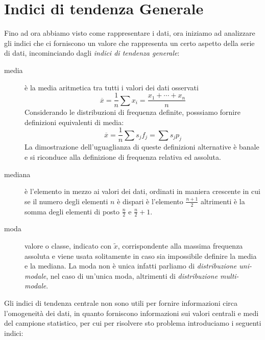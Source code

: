 \documentclass[a4paper,12pt, oneside]{book}
\begin{document}
\section{Indici di tendenza Generale}
Fino ad ora abbiamo visto come rappresentare i dati, ora iniziamo ad analizzare gli indici
che ci forniscono un valore che rappresenta un certo aspetto della serie di dati, 
incominciando dagli \emph{indici di tendenza generale}:
\begin{description}
    \item [media] è la media aritmetica tra tutti i valori dei dati osservati 
            \[ \overline{x} = \frac{1}{n} \sum x_i = \frac{x_1 + \cdots + x_n}{n} \]
            Considerando le distribuzioni di frequenza definite, posssiamo fornire definizioni equivalenti di media:
                \[ \overline{x} = \frac{1}{n} \sum s_j f_j = \sum s_j p_j \]
                La dimostrazione dell'uguaglianza di queste definizioni alternative è banale e si riconduce 
                alla definizione di frequenza relativa ed assoluta.

    \item [mediana] è l'elemento in mezzo ai valori dei dati, ordinati in maniera crescente
            in cui se il numero degli elementi $n$ è dispari è l'elemento $\frac{n + 1}{2}$
            altrimenti è la somma degli elementi di posto $\frac{n}{2}$ e $\frac{n}{2} + 1$.

    \item [moda] valore o classe, indicato con $\widetilde{x}$, corrispondente alla massima frequenza assoluta
                 e viene usata solitamente in caso sia impossibile definire la media e la mediana.\newline
            La moda non è unica infatti parliamo di \emph{distribuzione uni-modale}, nel caso di un'unica moda,
            altrimenti di \emph{distribuzione multi-modale}.
\end{description}
Gli indici di tendenza centrale non sono utili per fornire informazioni circa l'omogeneità dei dati, in quanto forniscono 
informazioni sui valori centrali e medi del campione statistico, per cui per risolvere sto problema
introduciamo i seguenti indici:
\end{document}
